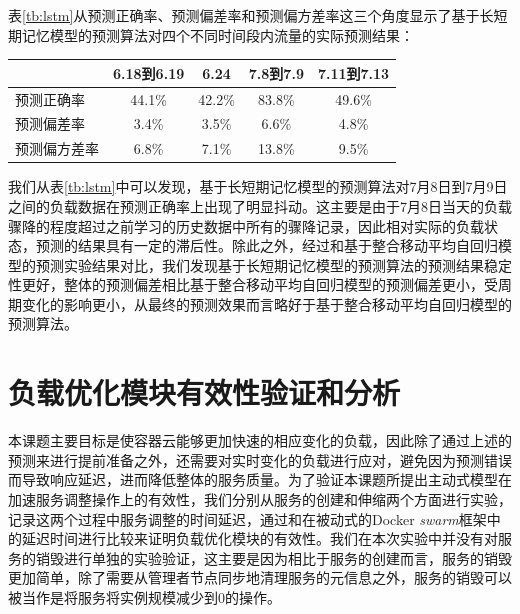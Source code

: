 表\ref{tb:lstm}从预测正确率、预测偏差率和预测偏方差率这三个角度显示了基于长短期记忆模型的预测算法对四个不同时间段内流量的实际预测结果：
\begin{table}[h]
\centering
{}
\begin{tabular}{@{}lcccc@{}}\toprule
  & 6.18到6.19 & 6.24 & 7.8到7.9 & 7.11到7.13 \\ \midrule
 预测正确率 & 44.1\% & 42.2\% & 83.8\% & 49.6\% \\
 预测偏差率 & 3.4\% & 3.5\% & 6.6\% & 4.8\% \\
 预测偏方差率 & 6.8\% & 7.1\% & 13.8\% & 9.5\% \\ \bottomrule
\end{tabular}
\end{table}

我们从表\ref{tb:lstm}中可以发现，基于长短期记忆模型的预测算法对7月8日到7月9日之间的负载数据在预测正确率上出现了明显抖动。这主要是由于7月8日当天的负载骤降的程度超过之前学习的历史数据中所有的骤降记录，因此相对实际的负载状态，预测的结果具有一定的滞后性。除此之外，经过和基于整合移动平均自回归模型的预测实验结果对比，我们发现基于长短期记忆模型的预测算法的预测结果稳定性更好，整体的预测偏差相比基于整合移动平均自回归模型的预测偏差更小，受周期变化的影响更小，从最终的预测效果而言略好于基于整合移动平均自回归模型的预测算法。

\section{负载优化模块有效性验证和分析}
本课题主要目标是使容器云能够更加快速的相应变化的负载，因此除了通过上述的预测来进行提前准备之外，还需要对实时变化的负载进行应对，避免因为预测错误而导致响应延迟，进而降低整体的服务质量。为了验证本课题所提出主动式模型在加速服务调整操作上的有效性，我们分别从服务的创建和伸缩两个方面进行实验，记录这两个过程中服务调整的时间延迟，通过和在被动式的Docker \emph{swarm}框架中的延迟时间进行比较来证明负载优化模块的有效性。我们在本次实验中并没有对服务的销毁进行单独的实验验证，这主要是因为相比于服务的创建而言，服务的销毁更加简单，除了需要从管理者节点同步地清理服务的元信息之外，服务的销毁可以被当作是将服务将实例规模减少到0的操作。

